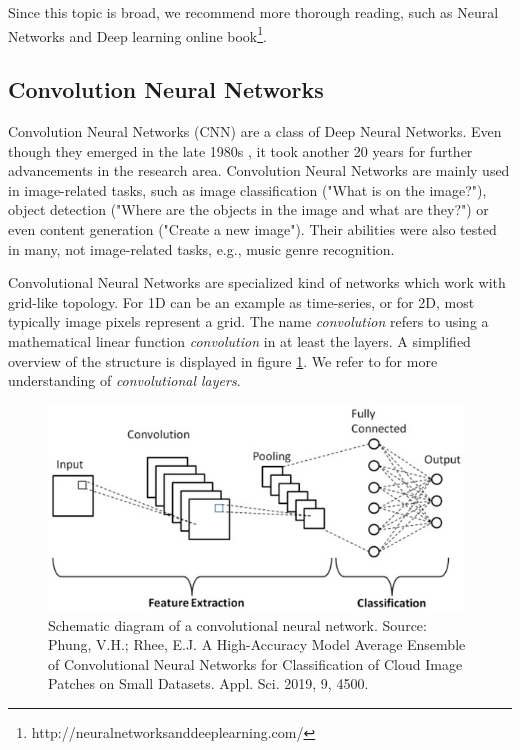 Since this topic is broad, we recommend more thorough reading, such as Neural Networks and Deep learning online book\footnote{http://neuralnetworksanddeeplearning.com/}.

\subsection{Convolution Neural Networks}

Convolution Neural Networks (CNN) are a class of Deep Neural Networks. Even though they emerged in the late 1980s \citep{lecun1989backpropagation}, it took another 20 years for further advancements in the research area. Convolution Neural Networks are mainly used in image-related tasks, such as image classification ("What is on the image?"), object detection ("Where are the objects in the image and what are they?") or even content generation ("Create a new image"). Their abilities were also tested in many, not image-related tasks, e.g., music genre recognition.

Convolutional Neural Networks are specialized kind of networks which work with grid-like topology. For 1D can be an example as time-series, or for 2D, most typically image pixels represent a grid. The name \emph{convolution} refers to using a mathematical linear function \emph{convolution} in at least the layers. A simplified overview of the structure is displayed in figure \ref{fig:convolution_neural_network}. We refer to \cite{Goodfellow-et-al-2016} for more understanding of \emph{convolutional layers}.

\begin{figure}
    \centering
    \includegraphics[width=0.98\textwidth]{img/convolution_neural_network.jpg}
    \caption{Schematic diagram of a convolutional neural network. Source: Phung, V.H.; Rhee, E.J. A High-Accuracy Model Average Ensemble of Convolutional Neural Networks for Classification of Cloud Image Patches on Small Datasets. Appl. Sci. 2019, 9, 4500.}
    \label{fig:convolution_neural_network}
\end{figure}

